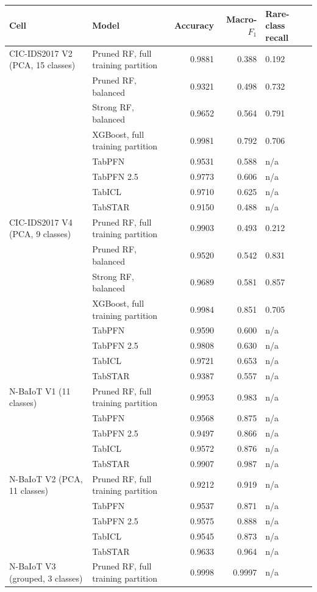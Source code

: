 \begin{tabular}{@{}llrrl@{}}
\toprule
Cell & Model & Accuracy & Macro-$F_1$ & Rare-class recall \\
\midrule
CIC-IDS2017 V2 (PCA, 15 classes) & Pruned RF, full training partition & 0.9881 & 0.388 & 0.192 \\
 & Pruned RF, balanced & 0.9321 & 0.498 & 0.732 \\
 & Strong RF, balanced & 0.9652 & 0.564 & 0.791 \\
 & XGBoost, full training partition & 0.9981 & 0.792 & 0.706 \\
 & TabPFN & 0.9531 & 0.588 & n/a \\
 & TabPFN 2.5 & 0.9773 & 0.606 & n/a \\
 & TabICL & 0.9710 & 0.625 & n/a \\
 & TabSTAR & 0.9150 & 0.488 & n/a \\
\addlinespace
CIC-IDS2017 V4 (PCA, 9 classes) & Pruned RF, full training partition & 0.9903 & 0.493 & 0.212 \\
 & Pruned RF, balanced & 0.9520 & 0.542 & 0.831 \\
 & Strong RF, balanced & 0.9689 & 0.581 & 0.857 \\
 & XGBoost, full training partition & 0.9984 & 0.851 & 0.705 \\
 & TabPFN & 0.9590 & 0.600 & n/a \\
 & TabPFN 2.5 & 0.9808 & 0.630 & n/a \\
 & TabICL & 0.9721 & 0.653 & n/a \\
 & TabSTAR & 0.9387 & 0.557 & n/a \\
\addlinespace
N-BaIoT V1 (11 classes) & Pruned RF, full training partition & 0.9953 & 0.983 & n/a \\
 & TabPFN & 0.9568 & 0.875 & n/a \\
 & TabPFN 2.5 & 0.9497 & 0.866 & n/a \\
 & TabICL & 0.9572 & 0.876 & n/a \\
 & TabSTAR & 0.9907 & 0.987 & n/a \\
\addlinespace
N-BaIoT V2 (PCA, 11 classes) & Pruned RF, full training partition & 0.9212 & 0.919 & n/a \\
 & TabPFN & 0.9537 & 0.871 & n/a \\
 & TabPFN 2.5 & 0.9575 & 0.888 & n/a \\
 & TabICL & 0.9545 & 0.873 & n/a \\
 & TabSTAR & 0.9633 & 0.964 & n/a \\
\addlinespace
N-BaIoT V3 (grouped, 3 classes) & Pruned RF, full training partition & 0.9998 & 0.9997 & n/a \\

\end{tabular}
